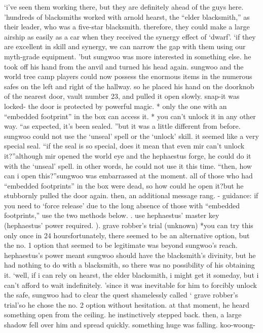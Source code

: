 ‘i’ve seen them working there, but they are definitely ahead of the guys here.
’hundreds of blacksmiths worked with arnold hearst, the “elder blacksmith,” as their leader, who was a five-star blacksmith.
therefore, they could make a large airship as easily as a car when they received the synergy effect of ‘dwarf’.
‘if they are excellent in skill and synergy, we can narrow the gap with them using our myth-grade equipment.
’but sungwoo was more interested in something else.
 he took off his hand from the anvil and turned his head again.
sungwoo and the world tree camp players could now possess the enormous items in the numerous safes on the left and right of the hallway.
so he placed his hand on the doorknob of the nearest door, vault number 23, and pulled it open slowly.
snap-it was locked- the door is protected by powerful magic.
* only the one with an “embedded footprint” in the box can access it.
* you can’t unlock it in any other way.
“as expected, it’s been sealed.
”but it was a little different from before.
 sungwoo could not use the ‘unseal’ spell or the ‘unlock’ skill.
 it seemed like a very special seal.
“if the seal is so special, does it mean that even mir can’t unlock it?”although mir opened the world eye and the hephaestus forge, he could do it with the ‘unseal’ spell.
 in other words, he could not use it this time.
“then, how can i open this?”sungwoo was embarrassed at the moment.
 all of those who had “embedded footprints” in the box were dead, so how could he open it?but he stubbornly pulled the door again.
 then, an additional message rang.
- guidance: if you need to ‘force release’ due to the long absence of those with “embedded footprints,” use the two methods below.
.
 use hephaestus’ master key (hephaestus’ power required.
).
 grave robber’s trial (unknown) *you can try this only once in 24 hoursfortunately, there seemed to be an alternative option, but the no.
 1 option that seemed to be legitimate was beyond sungwoo’s reach.
hephaestus’s power meant sungwoo should have the blacksmith’s divinity, but he had nothing to do with a blacksmith, so there was no possibility of his obtaining it.
‘well, if i can rely on hearst, the elder blacksmith, i might get it someday, but i can’t afford to wait indefinitely.
’since it was inevitable for him to forcibly unlock the safe, sungwoo had to clear the quest shamelessly called ‘ grave robber’s trial’so he chose the no.
 2 option without hesitation.
at that moment, he heard something open from the ceiling.
 he instinctively stepped back.
then, a large shadow fell over him and spread quickly.
 something huge was falling.
koo-woong-

